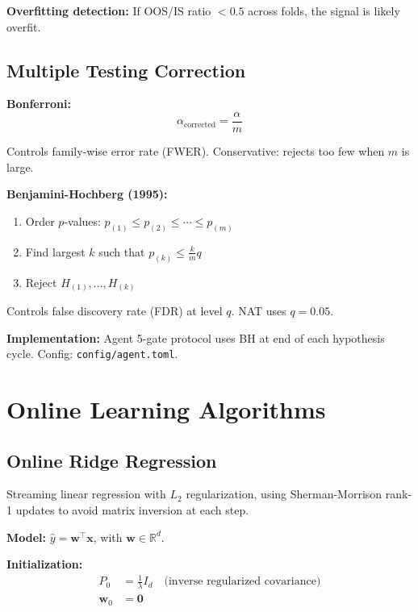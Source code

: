 \documentclass[11pt,a4paper]{article}
\begin{document}
\textbf{Overfitting detection:} If OOS/IS ratio $< 0.5$ across folds, the signal is likely overfit.

\subsection{Multiple Testing Correction}

\textbf{Bonferroni:}
\begin{equation}
\alpha_{\text{corrected}} = \frac{\alpha}{m}
\end{equation}

Controls family-wise error rate (FWER). Conservative: rejects too few when $m$ is large.

\textbf{Benjamini-Hochberg (1995):}
\begin{enumerate}
    \item Order $p$-values: $p_{(1)} \leq p_{(2)} \leq \cdots \leq p_{(m)}$
    \item Find largest $k$ such that $p_{(k)} \leq \frac{k}{m} q$
    \item Reject $H_{(1)}, \ldots, H_{(k)}$
\end{enumerate}

Controls false discovery rate (FDR) at level $q$. NAT uses $q = 0.05$.

\textbf{Implementation:} Agent 5-gate protocol uses BH at end of each hypothesis cycle. Config: \texttt{config/agent.toml}.

\newpage
\section{Online Learning Algorithms}

\subsection{Online Ridge Regression}

Streaming linear regression with $L_2$ regularization, using Sherman-Morrison rank-1 updates to avoid matrix inversion at each step.

\textbf{Model:} $\hat{y} = \mathbf{w}^\top \mathbf{x}$, with $\mathbf{w} \in \mathbb{R}^d$.

\textbf{Initialization:}
\begin{align}
P_0 &= \frac{1}{\lambda} I_d \quad \text{(inverse regularized covariance)} \\
\mathbf{w}_0 &= \mathbf{0}
\end{align}
\end{document}
